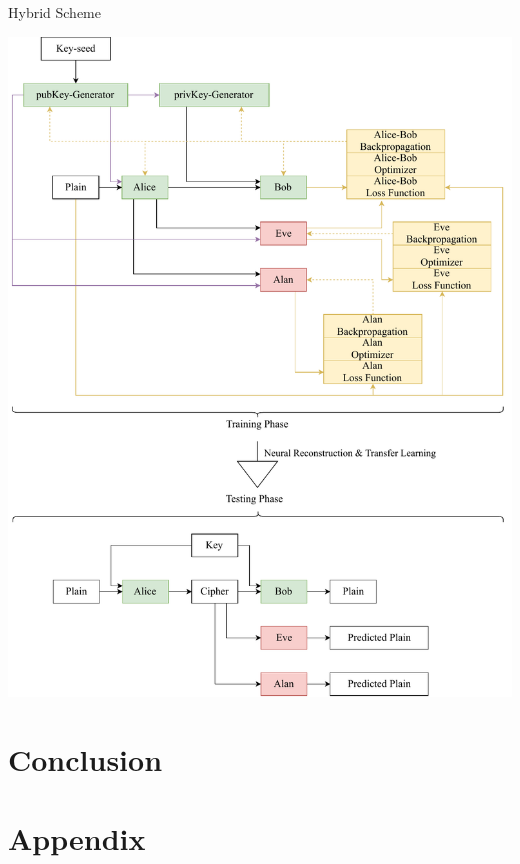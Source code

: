 \documentclass[a4paper, 12pt]{report}
\begin{document}
\begin{blockfigure}{ Hybrid Scheme}
	\begin{center}
		\includegraphics[width = \textwidth]{hybridScheme}
	\end{center}
\end{blockfigure}
\newpage
\chapter{Conclusion}\label{sec:conclusion}
\newpage
\appendix
\chapter*{Appendix}

\newpage
\medskip


\end{document}
